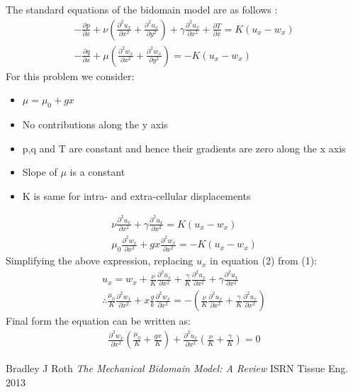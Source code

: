 \documentclass[a4paper,oneside,11pt]{report}
\begin{document}
The standard equations of the bidomain model are as follows \cite{roth2012}: 
\begin{align}
-\frac{\partial p}{\partial x} + \nu(\frac{\partial^{2}u_x}{\partial x^2} + \frac{\partial^{2}u_x}{\partial y^2} ) + \gamma\frac{\partial^{2}u_x}{\partial x^2} + \frac{\partial T}{\partial x} = K(u_x - w_x) \\
-\frac{\partial q}{\partial x} + \mu(\frac{\partial^{2}w_x}{\partial x^2} + \frac{\partial^{2}w_x}{\partial y^2} ) = -K(u_x - w_x) 
\end{align}   
For this problem we consider:
\begin{itemize} 
\item $\mu = \mu_0 + gx$ 
\item No contributions along the y axis
\item p,q and T are constant and hence their gradients are zero along the x axis
\item Slope of $\mu$ is a constant 
\item K is same for intra- and extra-cellular displacements
\end{itemize}
\begin{align}
    \nu\frac{\partial^{2}u_x}{\partial x^2} + \gamma\frac{\partial^{2}u_x}{\partial x^2} = K(u_x - w_x)  \\
    \mu_0\frac{\partial^{2}w_x}{\partial x^2} + gx\frac{\partial^{2}w_x}{\partial x^2} = -K(u_x - w_x) 
\end{align}
Simplifying the above expression, replacing $u_x$ in equation (2) from (1): 
\begin{align}
   u_x = w_x + \frac{\nu}{K}\frac{\partial^{2}u_x}{\partial x^2} + \frac{\gamma}{K}\frac{\partial^{2}u_x}{\partial x^2} + \gamma\frac{\partial^{2}u_x}{\partial x^2} \\
   \therefore \frac{\mu_0}{K}\frac{\partial^{2}w_x}{\partial x^2} + x\frac{g}{k}\frac{\partial^{2}w_x}{\partial x^2} = - ( \frac{\nu}{K}\frac{\partial^{2}u_x}{\partial x^2} + \frac{\gamma}{K}\frac{\partial^{2}u_x}{\partial x^2} )
\end{align}
Final form the equation can be written as: 
\begin{align}
\frac{\partial^{2}w_x}{\partial x^2} (\frac{\mu_0}{K} + \frac{gx}{K}) + \frac{\partial^{2}u_x}{\partial x^2} (\frac{\nu}{K} + \frac{\gamma}{K} ) = 0
\end{align}
\begin{thebibliography}{9}
	Bradley J Roth
	\textit{The Mechanical Bidomain Model: A Review}
	ISRN Tissue Eng. 2013
\end{thebibliography}
\end{document}

